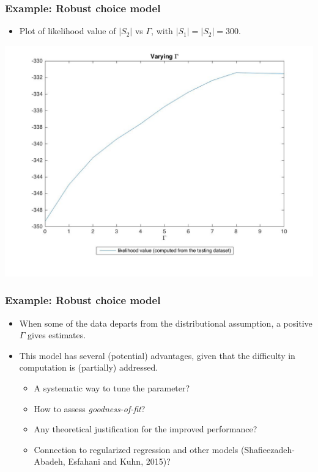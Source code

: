 \documentclass{beamer}
\begin{document}
\begin{frame}
	\frametitle{Example: Robust choice model}
	\begin{itemize}
		\item Plot of likelihood value of $|S_2|$ vs $\Gamma$, with $|S_1|=|S_2|=300$.
	\end{itemize}
	\includegraphics[scale=0.25]{vary_gamma_300_300_1_to_10}
\end{frame}

\begin{frame}
	\frametitle{Example: Robust choice model}
	\begin{itemize}
		\item When some of the data departs from the distributional assumption, a positive $\Gamma$ gives  estimates.
		\item This model has several (potential) advantages, given that the difficulty in computation is (partially) addressed.
		\begin{itemize}
			\item A systematic way to tune the parameter?
			\item How to assess \textit{goodness-of-fit}?
			\item Any theoretical justification for the improved performance?
			\item Connection to regularized regression and other models (Shafieezadeh-Abadeh, Esfahani and Kuhn, 2015)?
		\end{itemize}
	\end{itemize}
\end{frame}
\end{document}
